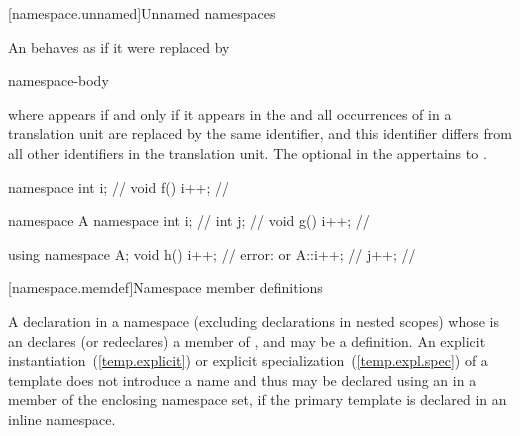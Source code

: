 [namespace.unnamed]{Unnamed namespaces}%

\pnum
An  behaves as if it were
replaced by

\begin{ncsimplebnf}
\opt {} \uniquens{} \br
{} \uniquens{} \terminal{;}\br
{} \uniquens{} \terminal{\{} namespace-body \terminal{\}}
\end{ncsimplebnf}

where
 appears if and only if it appears in the
and all occurrences of \uniquens{} in a translation unit are replaced by
the same identifier, and this identifier differs from all other
identifiers in the translation unit.
The optional 
in the 
appertains to \uniquens{}.
\enterexample

\begin{codeblock}
namespace { int i; }            // \uniquens{}
void f() { i++; }               // \uniquens{}

namespace A {
  namespace {
    int i;                      // \uniquens{}
    int j;                      // \uniquens{}
  }
  void g() { i++; }             // \uniquens{}
}

using namespace A;
void h() {
  i++;                          // error: \uniquens{} or \uniquens{}
  A::i++;                       // \uniquens{}
  j++;                          // \uniquens{}
}
\end{codeblock}
\exitexample

[namespace.memdef]{Namespace member definitions}%

\pnum
A declaration in a namespace  (excluding declarations in nested scopes)
whose  is an 
declares (or redeclares) a member of , and may be a definition.
\enternote An explicit instantiation~(\ref{temp.explicit}) or
explicit specialization~(\ref{temp.expl.spec}) of a template
does not introduce a name and thus may be declared using an
 in a member of the enclosing namespace set,
if the primary template is declared in an inline namespace. \exitnote
\enterexample

